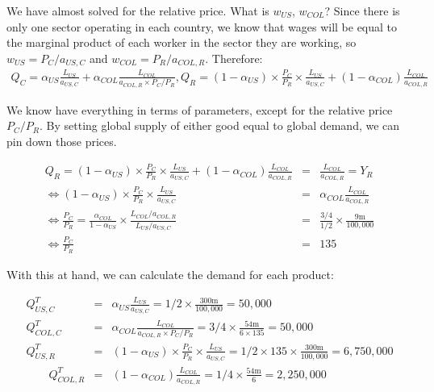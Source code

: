 \documentclass[11pt,letterpaper]{article}
\begin{document}
\newpage


We have almost solved for the relative price. What is $w_{US}$, $w_{COL}$? Since there is only one sector operating in each country, we know that wages will be equal to the marginal product of each worker in the sector they are working, so $w_{US} = P_{C} / a_{US,C}$ and $w_{COL} = P_{R} / a_{COL,R}$. Therefore:
\begin{eqnarray*}
    Q_{C} = \alpha_{US} \frac{L_{US} }{a_{US,C}} + \alpha_{COL} \frac{L_{COL} }{a_{COL,R} \times  P_C/P_R}, Q_{R} = (1-\alpha_{US}) \times \frac{P_C}{P_R} \times \frac{ L_{US} }{a_{US,C}} + (1-\alpha_{COL}) \frac{L_{COL} }{a_{COL,R}}    
\end{eqnarray*}

We know have everything in terms of parameters, except for the relative price $P_C/P_R$. By setting global supply of either good equal to global demand, we can pin down those prices.  

\begin{eqnarray*}
    Q_{R} = (1-\alpha_{US}) \times \frac{P_C}{P_R} \times \frac{ L_{US} }{a_{US,C}} + (1-\alpha_{COL}) \frac{L_{COL} }{a_{COL,R}} &=& \frac{L_{COL} }{a_{COL,R}} = Y_R \\ 
\iff (1-\alpha_{US}) \times \frac{P_C}{P_R} \times \frac{ L_{US} }{a_{US,C}} &=& \alpha_{COL} \frac{L_{COL} }{a_{COL,R}} \\
\iff \frac{P_C}{P_R}  = \frac{\alpha_{COL}}{1-\alpha_{US}} \times \frac{L_{COL}/a_{COL,R}}{L_{US} / a_{US,C}} &=& \frac{3/4}{1/2} \times \frac{9 \text{m}}{100{,}000} \\ 
\iff \frac{P_C}{P_R} &=& 135
\end{eqnarray*}

With this at hand, we can calculate the demand for each product:

\begin{eqnarray*}
    Q^T_{US,C} &=& \alpha_{US} \frac{L_{US} }{a_{US,C}} = 1/2 \times \frac{300 \text{m}}{100{,}000} = 50,000 \\
    Q^T_{COL,C} &=& \alpha_{COL} \frac{L_{COL} }{a_{COL,R} \times P_C/P_R} = 3/4 \times \frac{54 \text{m}}{6 \times 135} = 50,000 \\
    Q^T_{US,R} &=& (1- \alpha_{US}) \times \frac{P_C}{P_R} \times \frac{L_{US} }{a_{US,C}} = 1/2 \times 135 \times \frac{300 \text{m}}{100{,}000} = 6,750,000 \\
    \qquad Q^T_{COL,R} &=& (1-\alpha_{COL}) \frac{L_{COL} }{a_{COL,R} } = 1/4 \times \frac{54 \text{m}}{6} = 2,250,000
\end{eqnarray*}
\end{document}
